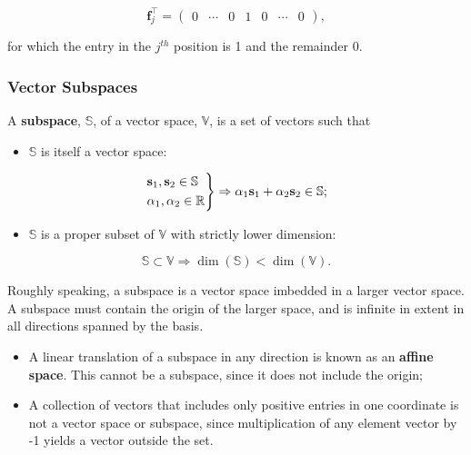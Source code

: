 \documentclass[12pt, twoside, draft]{article}
\begin{document}
\begin{equation}\label{eq:natural_basis_covectors}
\mathbf{f}_j^\top = \begin{pmatrix} 0 & \cdots & 0 & 1 & 0 & \cdots & 0 \end{pmatrix} ,
\end{equation}

for which the entry in the $j^{th}$ position is 1 and the remainder 0.

\subsubsection{Vector Subspaces}\label{sec:vector_subspaces}

A \textbf{subspace}, $\mathbb{S}$, of a vector space, $\mathbb{V}$, is a set of vectors such that
\begin{itemize}[noitemsep]
\item $\mathbb{S}$ is itself a vector space:
\end{itemize}
\begin{equation}\label{eq:vector_subspace}
\begin{rcases}
\mathbf{s}_1, \mathbf{s}_2 \in \mathbb{S} \\
\alpha_1, \alpha_2 \in \mathbb{R}
\end{rcases}
\Rightarrow
\alpha_1 \mathbf{s}_1 + \alpha_2 \mathbf{s}_2 \in \mathbb{S} ;
\end{equation}
\begin{itemize}[noitemsep]
\item $\mathbb{S}$ is a proper subset of $\mathbb{V}$ with strictly lower dimension:
\end{itemize}
\begin{equation}\label{eq:vector_subspace_dimension}
\mathbb{S} \subset \mathbb{V} \Rightarrow \dim(\mathbb{S}) < \dim(\mathbb{V}).  
\end{equation}

Roughly speaking, a subspace is a vector space imbedded in a larger vector space.  A subspace must contain the origin of the larger space, and is infinite in extent in all directions spanned by the basis.

\begin{itemize}[noitemsep]
\item A linear translation of a subspace in any direction is known as an \textbf{affine space}.  This cannot be a subspace, since it does not include the origin;  
\item A collection of vectors that includes only positive entries in one coordinate is not a vector space or subspace, since multiplication of any element vector by -1 yields a vector outside the set.
\end{itemize}
\end{document}
